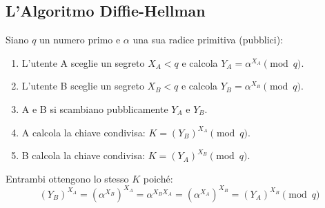 \subsection{L'Algoritmo Diffie-Hellman}
Siano $q$ un numero primo e $\alpha$ una sua radice primitiva (pubblici):
\begin{enumerate}
    \item L'utente A sceglie un segreto $X_A < q$ e calcola $Y_A = \alpha^{X_A} \pmod{q}$.
    \item L'utente B sceglie un segreto $X_B < q$ e calcola $Y_B = \alpha^{X_B} \pmod{q}$.
    \item A e B si scambiano pubblicamente $Y_A$ e $Y_B$.
    \item A calcola la chiave condivisa: $K = (Y_B)^{X_A} \pmod{q}$.
    \item B calcola la chiave condivisa: $K = (Y_A)^{X_B} \pmod{q}$.
\end{enumerate}

Entrambi ottengono lo stesso $K$ poiché:
$$(Y_B)^{X_A} = (\alpha^{X_B})^{X_A} = \alpha^{X_B X_A} = (\alpha^{X_A})^{X_B} = (Y_A)^{X_B} \pmod{q}$$